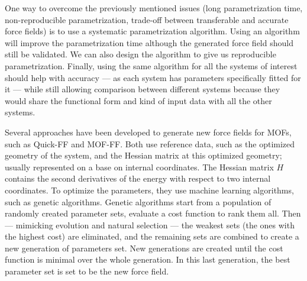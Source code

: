 \documentclass[thesis]{subfiles}
\begin{document}
One way to overcome the previously mentioned issues (long parametrization time,
non-reproducible parametrization, trade-off between transferable and accurate
force fields) is to use a systematic parametrization algorithm. Using an
algorithm will improve the parametrization time although the generated force
field should still be validated. We can also design the algorithm to give us
reproducible parametrization. Finally, using the same algorithm for all the
systems of interest should help with accuracy --- as each system has parameters
specifically fitted for it --- while still allowing comparison between different
systems because they would share the functional form and kind of input data with
all the other systems.

Several approaches have been developed to generate new force fields for MOFs,
such as Quick-FF\cite{Vanduyfhuys2015} and MOF-FF\cite{Bureekaew2013}. Both
use \abinitio reference data, such as the optimized geometry of the system, and
the Hessian matrix at this optimized geometry; usually represented on a base on
internal coordinates. The Hessian matrix $H$ contains the second derivatives of
the energy with respect to two internal coordinates. To optimize the
parameters, they use machine learning algorithms, such as genetic algorithms.
Genetic algorithms start from a population of randomly created parameter sets,
evaluate a cost function to rank them all. Then --- mimicking evolution
and natural selection --- the weakest sets (the ones with the highest cost) are
eliminated, and the remaining sets are combined to create a new generation of
parameters set. New generations are created until the cost function is minimal
over the whole generation. In this last generation, the best parameter set is
set to be the new force field.
\end{document}
